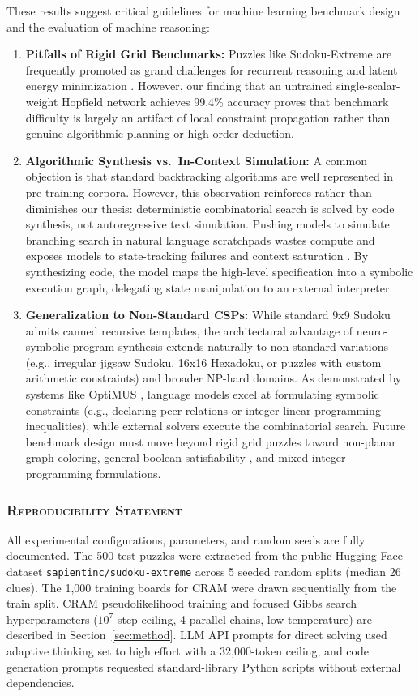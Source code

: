\documentclass{article} %
\begin{document}
These results suggest critical guidelines for machine learning benchmark design and the evaluation of machine reasoning:
\begin{enumerate}
    \item \textbf{Pitfalls of Rigid Grid Benchmarks:} Puzzles like Sudoku-Extreme are frequently promoted as grand challenges for recurrent reasoning and latent energy minimization \citep{Chen2026EnergybasedReasoners}. However, our finding that an untrained single-scalar-weight Hopfield network achieves 99.4\% accuracy proves that benchmark difficulty is largely an artifact of local constraint propagation rather than genuine algorithmic planning or high-order deduction.
    \item \textbf{Algorithmic Synthesis vs.\ In-Context Simulation:} A common objection is that standard backtracking algorithms are well represented in pre-training corpora. However, this observation reinforces rather than diminishes our thesis: deterministic combinatorial search is solved by code synthesis, not autoregressive text simulation. Pushing models to simulate branching search in natural language scratchpads wastes compute and exposes models to state-tracking failures and context saturation \citep{Yang2024NeurosymbolicArtificial,Liang2026BeyondTraining}. By synthesizing code, the model maps the high-level specification into a symbolic execution graph, delegating state manipulation to an external interpreter.
    \item \textbf{Generalization to Non-Standard CSPs:} While standard 9x9 Sudoku admits canned recursive templates, the architectural advantage of neuro-symbolic program synthesis extends naturally to non-standard variations (e.g., irregular jigsaw Sudoku, 16x16 Hexadoku, or puzzles with custom arithmetic constraints) and broader NP-hard domains. As demonstrated by systems like OptiMUS \citep{Ahmaditeshnizi2024OptimusScalable}, language models excel at formulating symbolic constraints (e.g., declaring peer relations or integer linear programming inequalities), while external solvers execute the combinatorial search. Future benchmark design must move beyond rigid grid puzzles toward non-planar graph coloring, general boolean satisfiability \citep{Selsam2018LearningSat}, and mixed-integer programming formulations.
\end{enumerate}

\subsubsection*{\textsc{Reproducibility Statement}}
All experimental configurations, parameters, and random seeds are fully documented. The 500 test puzzles were extracted from the public Hugging Face dataset \texttt{sapientinc/sudoku-extreme} across 5 seeded random splits (median 26 clues). The 1,000 training boards for CRAM were drawn sequentially from the train split. CRAM pseudolikelihood training and focused Gibbs search hyperparameters ($10^7$ step ceiling, 4 parallel chains, low temperature) are described in Section~\ref{sec:method}. LLM API prompts for direct solving used adaptive thinking set to high effort with a 32,000-token ceiling, and code generation prompts requested standard-library Python scripts without external dependencies.
\end{document}
